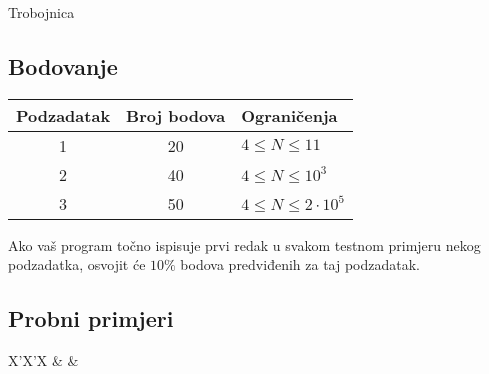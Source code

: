 \begin{statement}[
  problempoints=110,
  timelimit=2 sekunde,
  memorylimit=512 MiB,
]{Trobojnica}
\subsection*{Bodovanje}
{\renewcommand{\arraystretch}{1.4}
  \setlength{\tabcolsep}{6pt}
  \begin{tabular}{ccl}
 Podzadatak & Broj bodova & Ograničenja \\ \midrule
  1 & 20 & $4 \le N \le 11$ \\
  2 & 40 & $4 \le N \le 10^3$ \\
  3 & 50 & $4 \le N \le 2\cdot10^5$ \\
\end{tabular}}

Ako vaš program točno ispisuje prvi redak u svakom testnom primjeru nekog
podzadatka, osvojit će $10\%$ bodova predviđenih za taj podzadatak.

\subsection*{Probni primjeri}
\begin{tabularx}{\textwidth}{X'X'X}
 &
 &
\end{tabularx}




\end{statement}

